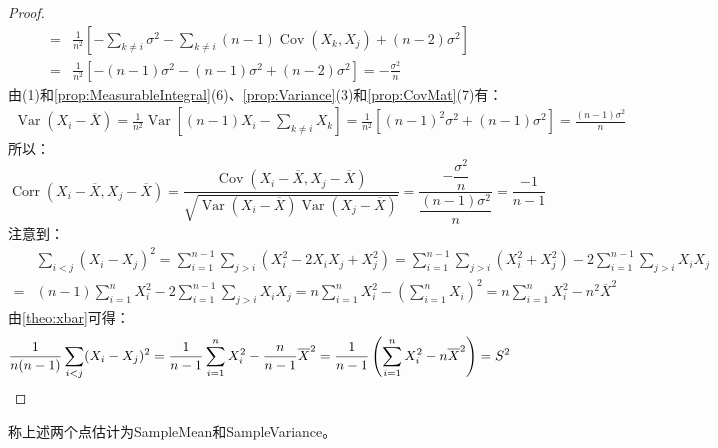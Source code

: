 \begin{proof}
\begin{align*}
		=&\frac{1}{n^2}\left[-\sum_{k\ne i}\sigma^2-\sum_{k\ne i}(n-1)\operatorname{Cov}(X_k,X_j)+(n-2)\sigma^2\right] \\
		=&\frac{1}{n^2}\left[-(n-1)\sigma^2-(n-1)\sigma^2+(n-2)\sigma^2\right]=-\frac{\sigma^2}{n}
	\end{align*}
	由(1)和\cref{prop:MeasurableIntegral}(6)、\cref{prop:Variance}(3)和\cref{prop:CovMat}(7)有：
	\begin{align*}
		\operatorname{Var}(X_i-\overline{X})=\frac{1}{n^2}\operatorname{Var}\left[(n-1)X_i-\sum_{k\ne i}X_k\right]=\frac{1}{n^2}[(n-1)^2\sigma^2+(n-1)\sigma^2]=\frac{(n-1)\sigma^2}{n}
	\end{align*}
	所以：
	\begin{equation*}
		\operatorname{Corr}(X_i-\overline{X},X_j-\overline{X})=\frac{\operatorname{Cov}(X_i-\overline{X},X_j-\overline{X})}{\sqrt{\operatorname{Var}(X_i-\overline{X})\operatorname{Var}(X_j-\overline{X})}}=\dfrac{-\dfrac{\sigma^2}{n}}{\dfrac{(n-1)\sigma^2}{n}}=\frac{-1}{n-1}
	\end{equation*}
	注意到：
	\begin{align*}
		&\sum_{i<j}(X_i-X_j)^2=\sum_{i=1}^{n-1}\sum_{j>i}(X_i^2-2X_iX_j+X_j^2)=\sum_{i=1}^{n-1}\sum_{j>i}(X_i^2+X_j^2)-2\sum_{i=1}^{n-1}\sum_{j>i}X_iX_j \\
		=&(n-1)\sum_{i=1}^{n}X_i^2-2\sum_{i=1}^{n-1}\sum_{j>i}X_iX_j=n\sum_{i=1}^{n}X_i^2-\left(\sum_{i=1}^{n}X_i\right)^2=n\sum_{i=1}^{n}X_i^2-n^2\overline{X}^2
	\end{align*}
	由\cref{theo:xbar}可得：
	\begin{equation*}
		\frac{1}{n(n-1)}\sum_{i<j}(X_i-X_j)^2=\frac{1}{n-1}\sum_{i=1}^{n}X_i^2-\frac{n}{n-1}\overline{X}^2=\frac{1}{n-1}\left(\sum_{i=1}^{n}X_i^2-n\overline{X}^2\right)=S^2\qedhere
	\end{equation*}
\end{proof}
\begin{definition}
	称上述两个点估计为\gls{SampleMean}和\gls{SampleVariance}。
\end{definition}
